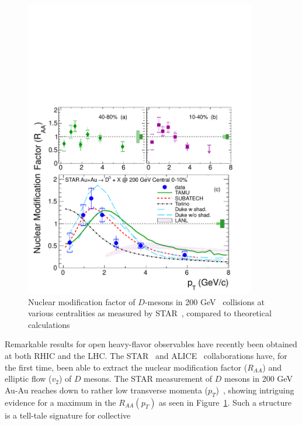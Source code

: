  \begin{figure}[tbh] 
 \centerline{ \includegraphics[width=0.90\textwidth]{fig/D-RAA-star} } 
 \caption[STAR measurements of $D$-meson production compared to theory]{Nuclear modification factor of $D$-mesons in 200 GeV \AuAu\ collisions 
 at various centralities as measured by STAR~\cite{Adamczyk:2014uip}, compared to 
 theoretical 
 calculations~\cite{Adil:2006ra,Gossiaux:2008jv,He:2011qa,Alberico:2013bza,Cao:2013ita} 
 } 
 \label{fig:D-RAA-star} 
 \end{figure} 
 Remarkable results for open heavy-flavor observables have recently been obtained at 
 both RHIC and the LHC. The STAR~\cite{Adamczyk:2014uip} and 
 ALICE~\cite{Alice:2012ab,Abelev:2013lca,Abelev:2014ipa} collaborations have, for the 
 first time, been able to extract the nuclear modification factor ($R_{AA}$) and 
 elliptic flow ($v_2$) of $D$ mesons. The STAR measurement of $D$ mesons in 200 GeV 
 Au-Au reaches down to rather low transverse momenta ($p_T$)~\cite{Adamczyk:2014uip}, 
 showing intriguing evidence for a maximum in the $R_{AA}(p_T)$ as seen in 
 Figure~\ref{fig:D-RAA-star}. Such a structure is a tell-tale signature for collective 
